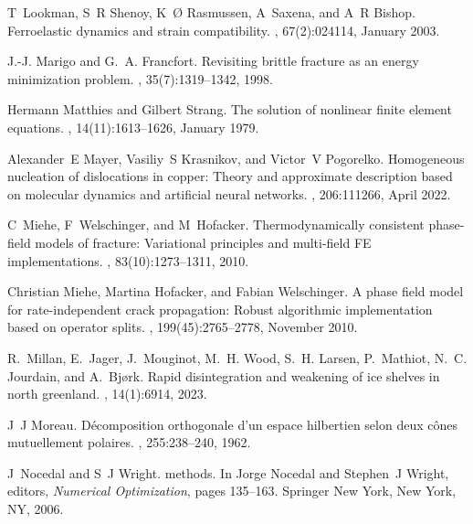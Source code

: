 \documentclass[10pt]{article}
\begin{document}
\begin{thebibliography}{10}
T~Lookman, S~R Shenoy, K~{\O} Rasmussen, A~Saxena, and A~R Bishop.
\newblock Ferroelastic dynamics and strain compatibility.
, 67(2):024114, January 2003.

J.-J. Marigo and G.~A. Francfort.
\newblock Revisiting brittle fracture as an energy minimization problem.
, 35(7):1319--1342, 1998.

Hermann Matthies and Gilbert Strang.
\newblock The solution of nonlinear finite element equations.
, 14(11):1613--1626, January 1979.

Alexander~E Mayer, Vasiliy~S Krasnikov, and Victor~V Pogorelko.
\newblock Homogeneous nucleation of dislocations in copper: Theory and approximate description based on molecular dynamics and artificial neural networks.
, 206:111266, April 2022.

C~Miehe, F~Welschinger, and M~Hofacker.
\newblock Thermodynamically consistent phase-field models of fracture: Variational principles and multi-field {FE} implementations.
, 83(10):1273--1311, 2010.

Christian Miehe, Martina Hofacker, and Fabian Welschinger.
\newblock A phase field model for rate-independent crack propagation: Robust algorithmic implementation based on operator splits.
, 199(45):2765--2778, November 2010.

R.~Millan, E.~Jager, J.~Mouginot, M.~H. Wood, S.~H. Larsen, P.~Mathiot, N.~C. Jourdain, and A.~Bj{\o}rk.
\newblock Rapid disintegration and weakening of ice shelves in north greenland.
, 14(1):6914, 2023.

J~J Moreau.
\newblock D{\'e}composition orthogonale d'un espace hilbertien selon deux c{\^o}nes mutuellement polaires.
, 255:238--240, 1962.

J~Nocedal and S~J Wright.
 methods.
\newblock In Jorge Nocedal and Stephen~J Wright, editors, {\em Numerical Optimization}, pages 135--163. Springer New York, New York, NY, 2006.


\end{thebibliography}
\end{document}
